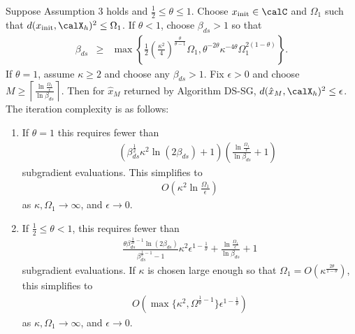 \begin{theorem}\label{thmRestart}
Suppose Assumption 3 holds and $\frac{1}{2}\leq \theta\leq 1$. Choose $x_{\text{init}}\in\calC$ and $\Omega_1$ such that $d(x_{\text{init}},\calX_h)^2\leq\Omega_1$. If $\theta<1$, choose $\beta_{ds}>1$ so that
\begin{eqnarray}\label{beta_bound}
\beta_{ds}&\geq& 
\max\left\{\frac{1}{2}
\left(\frac{\kappa^2}{4}\right)^{\frac{\theta}{\theta-1}}\Omega_1,
\theta^{-2\theta}\kappa^{-4\theta}\Omega_1^{2(1-\theta)}
\right\}.
\end{eqnarray}
If $\theta=1$, assume $\kappa\geq 2$ and choose any $\beta_{ds}>1$.
  Fix $\epsilon>0$ and choose $M\geq\left\lceil\frac{\ln\frac{\Omega_{1}}{\epsilon}}{\ln\beta_{ds}}\right\rceil$. Then for $\hat{x}_M$ returned by Algorithm DS-SG, $d(\hat{x}_M,\calX_h)^2\leq \epsilon$. The iteration complexity is as follows:
  \begin{enumerate}
  \item If $\theta=1$ this requires fewer than
  \begin{eqnarray}
     &&\left(\beta_{ds}^{\frac{1}{2}}  \kappa^2 \ln(2\beta_{ds})+1\right)
   \left(\frac{\ln\frac{\Omega_1}{\epsilon}}{\ln\beta_{ds}}+1\right)
  \label{Th1ResultA}\label{Th1Result}
  \end{eqnarray}
  subgradient evaluations. This simplifies to 
  \begin{align}\label{bigO1}
  O\left(\kappa^2\ln\frac{\Omega_1}{\epsilon}\right)
  \end{align}
  as $\kappa,\Omega_1\to\infty$, and $\epsilon\to 0$.
  \item If $\frac{1}{2}\leq\theta<1$, this requires fewer than
  \begin{eqnarray}
\frac{\theta
	\beta_{ds}^{\frac{3}{2\theta}-1}\ln(2\beta_{ds})}{\beta_{ds}^{\frac{1}{\theta}-1}-1
} 
\kappa^2
\epsilon^{1-\frac{1}{\theta}}
+
\frac{\ln\frac{\Omega_1}{\epsilon}}{\ln\beta_{ds}}+1  \label{scoreA}
  \end{eqnarray}
    subgradient evaluations. If $\kappa$ is chosen large enough so that $\Omega_1 = O(\kappa^{\frac{2\theta}{1-\theta}})$,
this simplifies to 
  \begin{align}\label{bigO}
  O\left(
\max\{\kappa^2,\Omega^{\frac{1}{\theta}-1}\}\epsilon^{1-\frac{1}{\theta}}
  \right)
  \end{align}
  as $\kappa,\Omega_1\to\infty$, and $\epsilon\to 0$. 
  

      \end{enumerate}
 \end{theorem}
